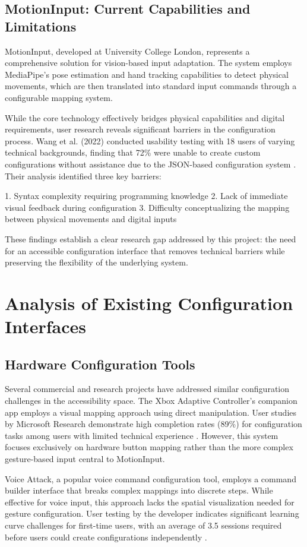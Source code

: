 \subsection{MotionInput: Current Capabilities and Limitations}
MotionInput, developed at University College London, represents a comprehensive solution for vision-based input adaptation. The system employs MediaPipe's pose estimation and hand tracking capabilities to detect physical movements, which are then translated into standard input commands through a configurable mapping system.

While the core technology effectively bridges physical capabilities and digital requirements, user research reveals significant barriers in the configuration process. Wang et al. (2022) conducted usability testing with 18 users of varying technical backgrounds, finding that 72\% were unable to create custom configurations without assistance due to the JSON-based configuration system \cite{wang2022}. Their analysis identified three key barriers:

1. Syntax complexity requiring programming knowledge
2. Lack of immediate visual feedback during configuration
3. Difficulty conceptualizing the mapping between physical movements and digital inputs

These findings establish a clear research gap addressed by this project: the need for an accessible configuration interface that removes technical barriers while preserving the flexibility of the underlying system.

\section{Analysis of Existing Configuration Interfaces}
\subsection{Hardware Configuration Tools}
Several commercial and research projects have addressed similar configuration challenges in the accessibility space. The Xbox Adaptive Controller's companion app employs a visual mapping approach using direct manipulation. User studies by Microsoft Research demonstrate high completion rates (89\%) for configuration tasks among users with limited technical experience \cite{microsoft2019}. However, this system focuses exclusively on hardware button mapping rather than the more complex gesture-based input central to MotionInput.

Voice Attack, a popular voice command configuration tool, employs a command builder interface that breaks complex mappings into discrete steps. While effective for voice input, this approach lacks the spatial visualization needed for gesture configuration. User testing by the developer indicates significant learning curve challenges for first-time users, with an average of 3.5 sessions required before users could create configurations independently \cite{voiceattack2020}.


